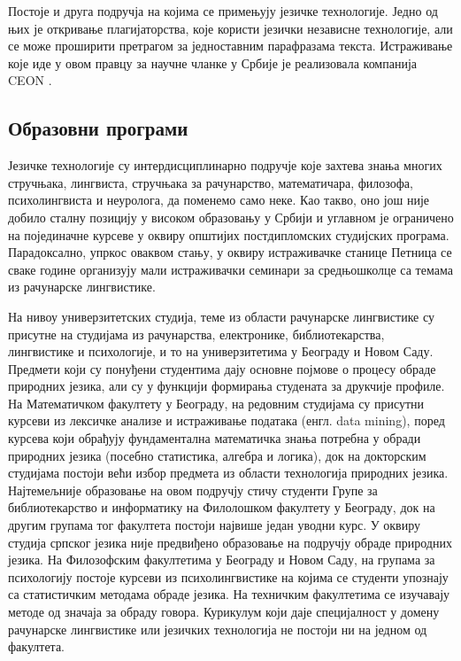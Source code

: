 \begin{multicols}{2}
Постоје и друга подручја на којима се примењују језичке технологије. Једно од њих је откривање плагијаторства, које користи језички независне технологије, али се може проширити  претрагом за једноставним парафразама текста. Истраживање које иде у овом правцу за научне чланке у Србије је реализовала компанија CEON \cite{CEON}.

 \subsection {Образовни програми}
 
Језичке технологије су интердисциплинарно подручје које захтева знања многих стручњака, лингвиста, стручњака за рачунарство, математичара, филозофа, психолингвиста и неуролога, да поменемо само неке. Као такво, оно још није добило сталну позицију у високом образовању у Србији и углавном је ограничено на појединачне курсеве у оквиру општијих постдипломских студијских програма. Парадоксално, упркос оваквом стању, у оквиру истраживачке станице Петница \cite{PETNICA} се сваке године организују мали истраживачки семинари за средњошколце са темама из рачунарске лингвистике. 

На нивоу универзитетских студија, теме из области рачунарске лингвистике су присутне на студијама из рачунарства, електронике, библиотекарства, лингвистике и психологије, и то на универзитетима у Београду и Новом Саду. Предмети који су понуђени студентима дају основне појмове о процесу обраде природних језика, али су у функцији формирања студената за друкчије профиле. На Математичком факултету у Београду, на редовним студијама су присутни курсеви из лексичке анализе и истраживање података (енгл. data mining), поред курсева који обрађују фундаментална математичка знања потребна у обради природних језика (посебно статистика, алгебра и логика), док на докторским студијама постоји већи избор предмета из области технологија природних језика. Најтемељније образовање на овом подручју стичу студенти Групе за библиотекарство и информатику на Филолошком факултету у Београду, док на другим групама тог факултета постоји највише један уводни курс. У оквиру студија српског језика није предвиђено образовање на подручју обраде природних језика. На Филозофским факултетима у Београду и Новом Саду, на групама за психологију постоје курсеви из психолингвистике на којима се студенти упознају са статистичким методама обраде језика. На техничким факултетима се изучавају методе од значаја за обраду говора. Курикулум који даје специјалност у домену рачунарске лингвистике или језичких технологија не постоји ни на једном од факултета. 


\end{multicols}

